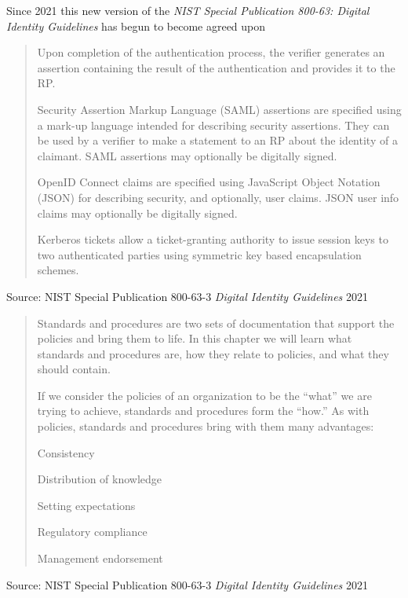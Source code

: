 \documentclass[Screen16to9,17pt]{foils}
\begin{document}
\begin{list2}
\item Since 2021 this new version of the \emph{NIST Special Publication 800-63: Digital Identity Guidelines} has begun to become agreed upon
\end{list2}



\begin{quote}
Upon completion of the authentication process, the verifier generates an assertion containing the
result of the authentication and provides it to the RP.
\begin{list2}
\item Security Assertion Markup Language (SAML) assertions are specified using a mark-up
language intended for describing security assertions. They can be used by a verifier to
make a statement to an RP about the identity of a claimant. SAML assertions may
optionally be digitally signed.
\item OpenID Connect claims are specified using JavaScript Object Notation (JSON) for
describing security, and optionally, user claims. JSON user info claims may optionally be
digitally signed.
\item Kerberos tickets allow a ticket-granting authority to issue session keys to two
authenticated parties using symmetric key based encapsulation schemes.
\end{list2}
\end{quote}
Source: NIST Special Publication 800-63-3 \emph{Digital Identity Guidelines} 2021




\begin{quote}
Standards and procedures are two sets of documentation that support the policies and bring them to life. In this chapter we will learn what standards and procedures are, how they relate to policies, and what they should contain.

If we consider the policies of an organization to be the “what” we are trying to achieve, standards and procedures form the “how.” As with policies, standards and procedures bring with them many advantages:
\begin{list2}
\item Consistency
\item Distribution of knowledge
\item Setting expectations
\item Regulatory compliance
\item Management endorsement
\end{list2}
\end{quote}
Source: NIST Special Publication 800-63-3 \emph{Digital Identity Guidelines} 2021
\end{document}
